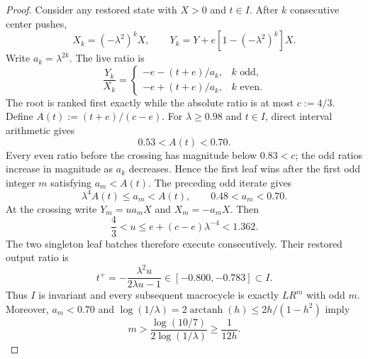 \begin{proof}
Consider any restored state with $X>0$ and $t\in I$.  After $k$ consecutive
center pushes,
\begin{equation*}
 X_k=(-\lambda^2)^kX,
 \qquad Y_k=Y+e[1-(-\lambda^2)^k]X.
\end{equation*}
Write $a_k=\lambda^{2k}$.  The live ratio is
\begin{equation}
 \frac{Y_k}{X_k}
 =\begin{cases}
  -e-(t+e)/a_k,&k\text{ odd},\\
  -e+(t+e)/a_k,&k\text{ even}.
 \end{cases}
 \label{eq:direct-three-vertex-root-run-ratio}
\end{equation}
The root is ranked first exactly while the absolute ratio is at most
$c:=4/3$.  Define $A(t):=(t+e)/(c-e)$.  For $\lambda\geq0.98$ and
$t\in I$, direct interval arithmetic gives
\begin{equation}
 0.53<A(t)<0.70.
 \label{eq:direct-three-vertex-A-interval}
\end{equation}
Every even ratio before the crossing has magnitude below $0.83<c$; the odd
ratios increase in magnitude as $a_k$ decreases.  Hence the first leaf wins
after the first odd integer $m$ satisfying $a_m<A(t)$.  The preceding odd
iterate gives
\begin{equation}
 \lambda^4A(t)\leq a_m<A(t),
 \qquad 0.48<a_m<0.70.
 \label{eq:direct-three-vertex-crossing-window}
\end{equation}
At the crossing write $Y_m=u a_mX$ and $X_m=-a_mX$.  Then
\begin{equation}
 \frac43<u\leq e+(c-e)\lambda^{-4}<1.362.
 \label{eq:direct-three-vertex-u-window}
\end{equation}
The two singleton leaf batches therefore execute consecutively.  Their
restored output ratio is
\begin{equation}
 t^+=-\frac{\lambda^2u}{2\lambda u-1}
 \in[-0.800,-0.783]\subset I.
 \label{eq:direct-three-vertex-invariant-interval}
\end{equation}
Thus $I$ is invariant and every subsequent macrocycle is exactly $LR^m$
with odd $m$.  Moreover, $a_m<0.70$ and
$\log(1/\lambda)=2\operatorname{arctanh}(h)\leq2h/(1-h^2)$ imply
\begin{equation}
 m>\frac{\log(10/7)}{2\log(1/\lambda)}
 \geq\frac1{12h}.
 \label{eq:direct-three-vertex-root-run-lower}
\end{equation}


\end{proof}
